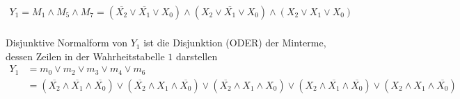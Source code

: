 \documentclass[]{article}
\newcommand{\V}{\lor}
\newcommand{\A}{\land}
\newcommand{\T}[1]{\overline{#1}}
\begin{document}
	\begin{align*}
	Y_1 = M_1 \A M_5 \A M_7 =
		(\T{X_2} \V \T{X_1} \V 	X_0) \A    %
		(    X_2 \V \T{X_1} \V    X_0) \A  %
		(    X_2 \V     X_1 \V    X_0)\\    %
	\end{align*}

	Disjunktive Normalform von $Y_1$ ist die Disjunktion (ODER) der Minterme, dessen Zeilen in der Wahrheitstabelle $1$ darstellen\\

	\begin{align*}
		Y_1 &= m_0 \V m_2 \V m_3 \V m_4 \V m_6\\
		&=
		(\T{X_2} \A \T{X_1} \A \T{X_0}) \V
		(\T{X_2} \A     X_1 \A \T{X_0}) \V
		(\T{X_2} \A     X_1 \A    X_0) \V
		(    X_2 \A \T{X_1} \A \T{X_0}) \V
		(    X_2 \A     X_1 \A \T{X_0})
	\end{align*}
\end{document}
